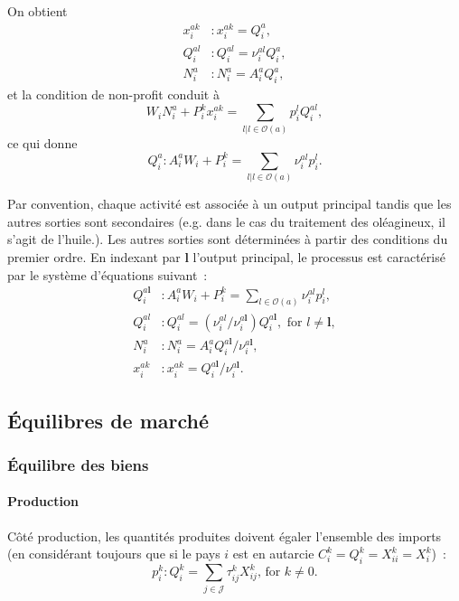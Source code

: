 On obtient
\begin{align}
	\label{eq_xiak}x^{ak}_i & : x^{ak}_i = Q_i^a,            \\
	Q_i^{al}                & : Q_i^{al} = \nu_i^{al} Q_i^a, \\
	\label{eq_nia} N_i^a    & :    N_i^a = A_i^a Q_i^a,
\end{align}
et la condition de non-profit conduit à
\begin{equation}
	W_i N_i^a + P_i^k x_i^{ak} = \sum_{{l|l\in \mathcal{O}(a)}} p_i^l Q_i^{al},
\end{equation}
ce qui donne
\begin{equation}\label{eq_qia}
	Q_i^a: A_i^a W_i + P_i^k = \sum_{l|l\in \mathcal{O}(a)} \nu_i^{al} p_i^{l}.
\end{equation}

Par convention, chaque activité est associée à un output principal tandis que les autres sorties sont secondaires (e.g. dans le cas du traitement des oléagineux, il s’agit de l’huile.). Les autres sorties sont déterminées à partir des conditions du premier ordre. En indexant par $\mathbf{l}$ l’output principal, le processus est caractérisé par le système d’équations suivant~:
\begin{align}
	Q_i^{a \mathbf{l}} & : A_i^a W_i + P_i^k = \sum_{l\in \mathcal{O}(a)} \nu_i^{al} p_i^{l},                                           \\
	Q_i^{al}           & : Q_i^{al}=\left( \nu_i^{al} / \nu_i^{a \mathbf{l}} \right)Q_i^{a \mathbf{l}}, \text{ for } l \neq \mathbf{l}, \\
	N_i^a              & : N_i^a=A_i^a Q_i^{a \mathbf{l}} / \nu_i^{a \mathbf{l}},                                                       \\
	x_i^{ak}           & :x_i^{ak}=Q_i^{a \mathbf{l}} / \nu_i^{a \mathbf{l}}.
\end{align}

\subsection{Équilibres de marché}
\subsubsection{Équilibre des biens}
\paragraph{Production} Côté production, les quantités produites doivent égaler l’ensemble des imports (en considérant toujours que si le pays $i$ est en autarcie $C_i^k = Q_i^k = X_{ii}^k = X_i^k$)~:
\begin{equation}
	p_i^k: Q_i^k = \sum_{j \in \mathcal{J}} \tau_{ij}^k X_{ij}^k \text{, for } k \neq 0.
\end{equation}

